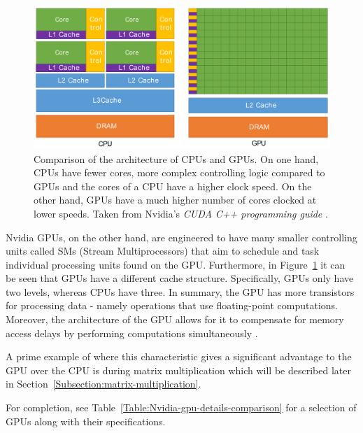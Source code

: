 \begin{figure}[h!]
	\centering
	\includegraphics[width=14cm, keepaspectratio]{images/ch1/nvidia_CPU_GPU_comparison.png}
	\caption{Comparison of the architecture of CPUs and GPUs. On one hand, CPUs have fewer cores, more complex controlling logic compared to GPUs and the cores of a CPU have a higher clock speed. On the other hand, GPUs have a much higher number of cores clocked at lower speeds. Taken from Nvidia's \emph{CUDA C++ programming guide} \cite{NVIDIAMay2022}.}
	\label{Figure:Nvidia-CPU-GPU-architecture-comparison}
\end{figure}

Nvidia GPUs, on the other hand, are engineered to have many smaller controlling units called SMs (Stream Multiprocessors) that aim to schedule and task individual processing units found on the GPU. Furthermore, in Figure~\ref{Figure:Nvidia-CPU-GPU-architecture-comparison} it can be seen that GPUs have a different cache structure. Specifically, GPUs only have two levels, whereas CPUs have three. In summary, the GPU has more transistors for processing data - namely operations that use floating-point computations. Moreover, the architecture of the GPU allows for it to compensate for memory access delays by performing computations simultaneously \cite{NVIDIAMay2022}.
\par A prime example of where this characteristic gives a significant advantage to the GPU over the CPU is during matrix multiplication which will be described later in Section~\ref{Subsection:matrix-multiplication}.

\par For completion, see Table~\ref{Table:Nvidia-gpu-details-comparison} for a selection of GPUs along with their specifications.

